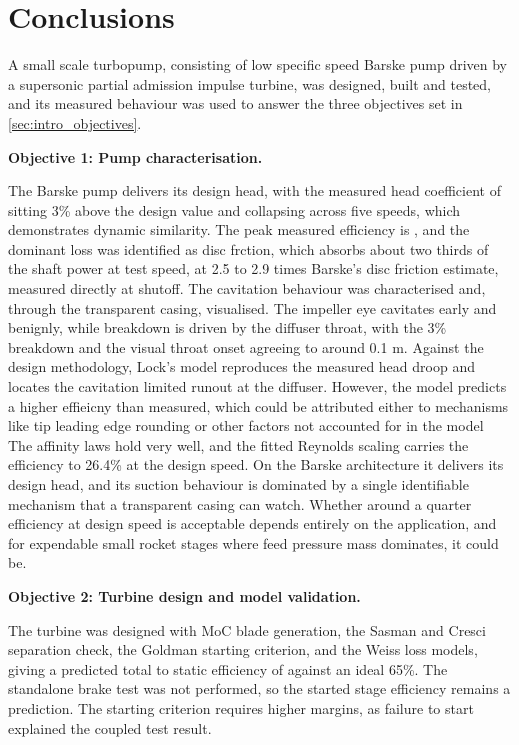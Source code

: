 \section{Conclusions}

A small scale turbopump, consisting of low specific speed Barske pump driven by a supersonic partial admission impulse turbine, was designed, built and tested, and its measured behaviour was used to answer the three objectives set in \cref{sec:intro_objectives}.

\textbf{Objective 1: Pump characterisation.} 

The Barske pump delivers its design head, with the measured head coefficient of \valPumpPsiMeas{} sitting 3\% above the design value and collapsing across five speeds, which demonstrates dynamic similarity. The peak measured efficiency is \valPumpEtaPeak, and the dominant loss was identified as disc frction, which absorbs about two thirds of the shaft power at test speed, at 2.5 to 2.9 times Barske's disc friction estimate, measured directly at shutoff. The cavitation behaviour was characterised and, through the transparent casing, visualised. The impeller eye cavitates early and benignly, while breakdown is driven by the diffuser throat, with the 3\% breakdown and the visual throat onset agreeing to around 0.1 m. Against the design methodology, Lock's model reproduces the measured head droop and locates the cavitation limited runout at the diffuser. However, the model predicts a higher effieicny than measured, which could be attributed either to mechanisms like tip leading edge rounding or other factors not accounted for in the model The affinity laws hold very well, and the fitted Reynolds scaling carries the efficiency to 26.4\% at the design speed. On the Barske architecture it delivers its design head, and its suction behaviour is dominated by a single identifiable mechanism that a transparent casing can watch. Whether around a quarter efficiency at design speed is acceptable depends entirely on the application, and for expendable small rocket stages where feed pressure mass dominates, it could be.

\textbf{Objective 2: Turbine design and model validation.} 

The turbine was designed with MoC blade generation, the Sasman and Cresci separation check, the Goldman starting criterion, and the Weiss loss models, giving a predicted total to static efficiency of \valTurbEtaTsDesign{} against an ideal 65\%. The standalone brake test was not performed, so the started stage efficiency remains a prediction. The starting criterion requires higher margins, as failure to start explained the coupled test result.

